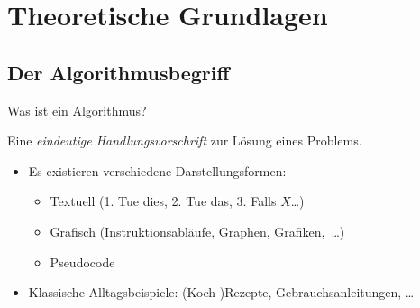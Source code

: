\section{Theoretische Grundlagen}
\subsection{Der Algorithmusbegriff}
\begin{frame}{Was ist ein Algorithmus?}
    \pause{}
    \begin{definition}[Algorithmus]
        \pause{}Eine \emph{eindeutige Handlungsvorschrift} zur Lösung eines Problems.
    \end{definition}
    \begin{itemize}[<+(1)->]
        \widei
        \item Es existieren verschiedene Darstellungsformen: \begin{itemize}
            \item Textuell \pause(1. Tue dies, 2. Tue das, 3. Falls \(X\)\ldots)
            \item Grafisch \pause(Instruktionsabläufe, Graphen, Grafiken,~\ldots)
            \item Pseudocode
        \end{itemize}
        \item Klassische Alltagsbeispiele:\pause{} (Koch-)Rezepte,\pause{} Gebrauchsanleitungen,\pause{} \ldots
    \end{itemize}
\end{frame}

